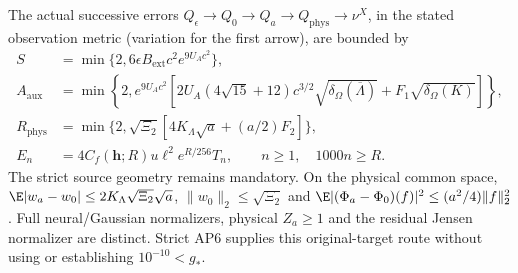 The actual successive errors $Q_\epsilon\to Q_0\to Q_a\to
Q_{\mathrm{phys}}\to\nu^X$, in the stated observation metric (variation
for the first arrow), are bounded by
\begin{align*}
 S&=\min\{2,6\epsilon B_{\mathrm{ext}}c^2e^{9U_Ac^2}\},\\
 A_{\mathrm{aux}}&=\min\left\{2,e^{9U_Ac^2}
 \left[2U_A(4\sqrt{15}+12)c^{3/2}\sqrt{\delta_\Omega(\overline\Lambda)}
                 +F_1\sqrt{\delta_\Omega(K)}\right]\right\},\\
 R_{\mathrm{phys}}&=\min\{2,\sqrt{\Xi_2}[4K_\Lambda\sqrt a+(a/2)F_2]\},\\
 E_n&=4C_f(\mathbf h;R)u\ell^2e^{R/256}T_n,
 \qquad n\ge1,\quad1000n\ge R.
\end{align*}
The strict source geometry remains mandatory. On the physical common
space, $\E|w_a-w_0|\le2K_\Lambda\sqrt{\Xi_2}\sqrt a$,
$\|w_0\|_2\le\sqrt{\Xi_2}$ and
$\E|(\Phi_a-\Phi_0)(f)|^2\le(a^2/4)\|f\|_2^2$.
Full neural/Gaussian normalizers, physical $Z_a\ge1$ and the residual
Jensen normalizer are distinct. Strict AP6 supplies this original-target
route without using or establishing $10^{-10}<g_*$.

